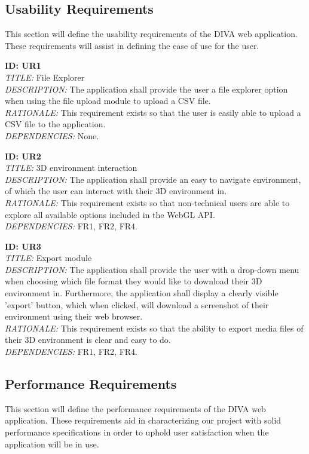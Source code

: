 \documentclass[journal,10pt,onecolumn,compsoc]{IEEEtran} \usepackage[margin=1.0in]{geometry} \usepackage{pdfpages}
\begin{document}
    \subsection{Usability Requirements}
    This section will define the usability requirements of the DIVA web application. These requirements will assist in defining the ease of use for the user. \newline

    \noindent \textbf{ID: UR1}\\
    \textit{TITLE:} File Explorer\\
    \textit{DESCRIPTION:} The application shall provide the user a file explorer option when using the file upload module to upload a CSV file.\\
    \textit{RATIONALE:} This requirement exists so that the user is easily able to upload a CSV file to the application.\\
    \textit{DEPENDENCIES:} None.
    \newline
    
    \noindent \textbf{ID: UR2}\\
    \textit{TITLE:} 3D environment interaction\\
    \textit{DESCRIPTION:} The application shall provide an easy to navigate environment, of which the user can interact with their 3D environment in.\\
    \textit{RATIONALE:} This requirement exists so that non-technical users are able to explore all available options included in the WebGL API.\\
    \textit{DEPENDENCIES:}  FR1, FR2, FR4.
    \newpage
    
    \noindent \textbf{ID: UR3}\\
    \textit{TITLE:} Export module\\
    \textit{DESCRIPTION:} The application shall provide the user with a drop-down menu when choosing which file format they would like to download their 3D environment in. Furthermore, the application shall display a clearly visible 'export' button, which when clicked, will download a screenshot of their environment using their web browser. \\
    \textit{RATIONALE:} This requirement exists so that the ability to export media files of their 3D environment is clear and easy to do. \\
    \textit{DEPENDENCIES:} FR1, FR2, FR4.
    \newline

    \subsection{Performance Requirements}
    This section will define the performance requirements of the DIVA web application. These requirements aid in characterizing our project with solid performance specifications in order to uphold user satisfaction when the application will be in use. \\
\end{document}
